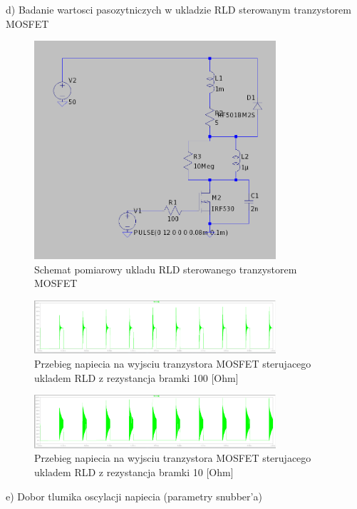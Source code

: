 \documentclass[11pt]{article}
\begin{document}
d) Badanie wartosci pasozytniczych w ukladzie RLD sterowanym tranzystorem MOSFET

\begin{figure}[H]
\centering
\includegraphics[width=0.8\textwidth]{aun1_rld_without_snubber.png}
\caption{Schemat pomiarowy ukladu RLD sterowanego tranzystorem MOSFET}
\end{figure}

\begin{figure}[H]
\centering
\includegraphics[width=0.8\textwidth]{aun1_rld_without_snubber_rgate100ohm.png}
\caption{Przebieg napiecia na wyjsciu tranzystora MOSFET sterujacego ukladem RLD z rezystancja bramki 100 [Ohm]}
\end{figure}

\begin{figure}[H]
\centering
\includegraphics[width=0.8\textwidth]{aun1_rld_without_snubber_rgate10ohm.png}
\caption{Przebieg napiecia na wyjsciu tranzystora MOSFET sterujacego ukladem RLD z rezystancja bramki 10 [Ohm]}
\end{figure}

e) Dobor tlumika oscylacji napiecia (parametry snubber'a)
\end{document}
